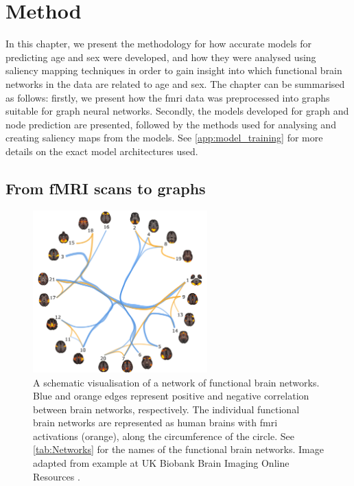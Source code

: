 \chapter{Method}
\label{chap:method}

In this chapter, we present the methodology for how accurate models for predicting age and sex were developed, and how they were analysed using saliency mapping techniques in order to gain insight into which functional brain networks in the data are related to age and sex. The chapter can be summarised as follows: firstly, we present how the \acrshort{fmri} data was preprocessed into graphs suitable for graph neural networks. Secondly, the models developed for graph and node prediction are presented, followed by the methods used for analysing and creating saliency maps from the models. See \cref{app:model_training} for more details on the exact model architectures used. 

\section{From fMRI scans to graphs}\label{sec:fmri_to_graphs}

\begin{figure}[!htbp]
    \centering
    \includegraphics[width=0.6\textwidth]{chapters/images_methods/fmri_network_ukbiobank.png}
    \caption{A schematic visualisation of a network of functional brain networks. Blue and orange edges represent positive and negative correlation between brain networks, respectively.  The individual functional brain networks are represented as human brains with \acrshort{fmri} activations (orange), along the circumference of the circle. See \cref{tab:Networks} for the names of the functional brain networks. Image adapted from example at UK Biobank Brain Imaging Online Resources \cite{ukbiobank_brain_imaging}.}
    \label{fig:fmri_network}
\end{figure}

